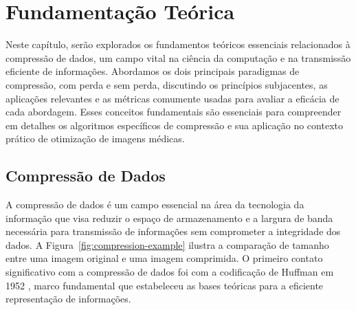 \chapter{Fundamentação Teórica}
\label{cap:fundamentacao-teorica}

Neste capítulo, serão explorados os fundamentos teóricos essenciais relacionados à compressão de dados, um campo vital na ciência da computação e na transmissão eficiente de informações. Abordamos os dois principais paradigmas de compressão, com perda e sem perda, discutindo os princípios subjacentes, as aplicações relevantes e as métricas comumente usadas para avaliar a eficácia de cada abordagem. Esses conceitos fundamentais são essenciais para compreender em detalhes os algoritmos específicos de compressão e sua aplicação no contexto prático de otimização de imagens médicas.

\section{Compressão de Dados}
\label{sec:compressão-de-dados}
A compressão de dados é um campo essencial na área da tecnologia da informação que visa reduzir o espaço de armazenamento e a largura de banda necessária para transmissão de informações sem comprometer a integridade dos dados. A Figura~\ref{fig:compression-example} ilustra a comparação de tamanho entre uma imagem original e uma imagem comprimida. O primeiro contato  significativo com a compressão de dados foi com a codificação de Huffman em 1952 \cite{huffmanArticle}, marco fundamental que estabeleceu as bases teóricas para a eficiente representação de informações.

\begin{figure}[!htbp]
	\centering
\end{figure}

